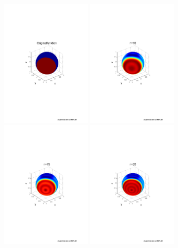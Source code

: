 \begin{refsection}
\begin{figure}%
\includegraphics[width=0.4\textwidth]{kugel/Gibbs/GibbsOriginalFunktion.pdf}
\includegraphics[width=0.4\textwidth]{kugel/Gibbs/GibbsN_10.pdf}
\includegraphics[width=0.4\textwidth]{kugel/Gibbs/GibbsN_15.pdf}
\includegraphics[width=0.4\textwidth]{kugel/Gibbs/GibbsN_20.pdf}

\end{figure}
\end{refsection}
